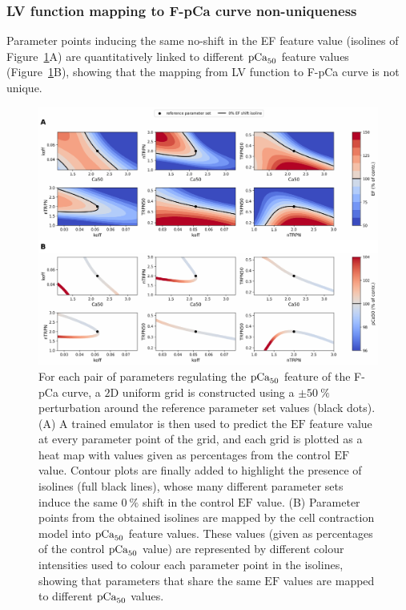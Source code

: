 %
%
%
\subsubsection{LV function mapping to F-pCa curve non-uniqueness}\label{sec:lvtofpcanonuniquemapping}
Parameter points inducing the same no-shift in the EF feature value (isolines of Figure~\ref{fig:EFisolines}A) are quantitatively linked to different $\textrm{pCa}_{50}$ feature values (Figure~\ref{fig:EFisolines}B), showing that the mapping from LV function to F-pCa curve is not unique.

\begin{figure}[h!]
    \myfloatalign
    \includegraphics[width=\textwidth]{figures/chapter08/Fig6.pdf}
    \caption{For each pair of parameters regulating the $\textrm{pCa}_{50}$ feature of the F-pCa curve, a $2$D uniform grid is constructed using a $\pm\SI{50}{\percent}$ perturbation around the reference parameter set values (black dots). (A) A trained emulator is then used to predict the $\textrm{EF}$ feature value at every parameter point of the grid, and each grid is plotted as a heat map with values given as percentages from the control $\textrm{EF}$ value. Contour plots are finally added to highlight the presence of isolines (full black lines), whose many different parameter sets induce the same $\SI{0}{\percent}$ shift in the control $\textrm{EF}$ value. (B) Parameter points from the obtained isolines are mapped by the cell contraction model into $\textrm{pCa}_{50}$ feature values. These values (given as percentages of the control $\textrm{pCa}_{50}$ value) are represented by different colour intensities used to colour each parameter point in the isolines, showing that parameters that share the same $\textrm{EF}$ values are mapped to different $\textrm{pCa}_{50}$ values.}
    \label{fig:EFisolines}
\end{figure}


